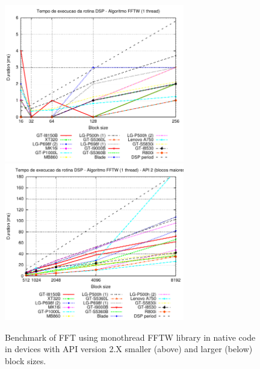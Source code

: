 \documentclass[12pt]{article}
\begin{document}
\begin{figure}[h!]
\begin{center}
\includegraphics[width=0.7\textwidth]{img/FFTW_MONO-2-a.pdf}
\includegraphics[width=0.7\textwidth]{img/FFTW_MONO-2-b.pdf}
\end{center}
\caption{Benchmark of FFT using monothread FFTW library in native code in
devices with API version 2.X smaller (above) and larger (below) block sizes.}
\label{fig:alg-fftw-mono}
\end{figure}
\end{document}
